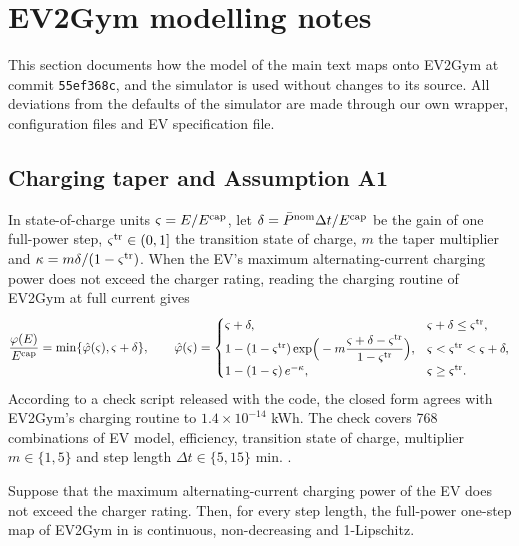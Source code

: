 \section{EV2Gym modelling notes}\label{sec:ev2gym}

This section documents how the model of the main text maps onto EV2Gym at commit \texttt{55ef368c}, and the simulator is used without changes to its source.
All deviations from the defaults of the simulator are made through our own wrapper, configuration files and EV specification file.

\subsection{Charging taper and Assumption A1}\label{app:taper}

In state-of-charge units $\varsigma=E/E^{\mathrm{cap}}$, let $\delta=\bar P^{\mathrm{nom}}\Delta t/E^{\mathrm{cap}}$ be the gain of one full-power step, $\varsigma^{\mathrm{tr}}\in(0,1]$ the transition state of charge, $m$ the taper multiplier and $\kappa=m\delta/(1-\varsigma^{\mathrm{tr}})$.
When the EV's maximum alternating-current charging power does not exceed the charger rating, reading the charging routine of EV2Gym at full current gives
\begin{equation}\label{eq:taper}
\frac{\varphi(E)}{E^{\mathrm{cap}}}=\min\{\hat\varphi(\varsigma),\varsigma+\delta\},\qquad
\hat\varphi(\varsigma)=\begin{cases}
\varsigma+\delta, & \varsigma+\delta\le\varsigma^{\mathrm{tr}},\\
1-(1-\varsigma^{\mathrm{tr}})\exp\!\Big(-m\dfrac{\varsigma+\delta-\varsigma^{\mathrm{tr}}}{1-\varsigma^{\mathrm{tr}}}\Big), & \varsigma<\varsigma^{\mathrm{tr}}<\varsigma+\delta,\\
1-(1-\varsigma)\,e^{-\kappa}, & \varsigma\ge\varsigma^{\mathrm{tr}}.
\end{cases}
\end{equation}
According to a check script released with the code, the closed form agrees with EV2Gym's charging routine to $1.4\times10^{-14}$ kWh.
The check covers 768 combinations of EV model, efficiency, transition state of charge, multiplier $m\in\{1,5\}$ and step length $\Delta t\in\{5,15\}$ min.
.

\begin{lemma}[A1 in EV2Gym]\label{lem:taper}
Suppose that the maximum alternating-current charging power of the EV does not exceed the charger rating.
Then, for every step length, the full-power one-step map of EV2Gym in  is continuous, non-decreasing and 1-Lipschitz.
\end{lemma}


